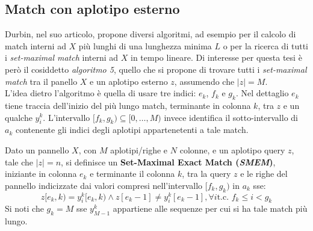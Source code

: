 \subsection{Match con aplotipo esterno}
Durbin, nel suo articolo, propone diversi algoritmi, ad esempio per il calcolo
di match interni ad $X$ più lunghi di una lunghezza minima $L$ o per la ricerca
di tutti i \textit{set-maximal match} interni ad $X$ in tempo lineare. Di
interesse per questa tesi è però il cosiddetto \textit{algoritmo 5}, quello che
si propone di trovare tutti i \textit{set-maximal match} tra il panello $X$ e un
aplotipo esterno $z$, assumendo che $|z|=M$.\\
L'idea dietro l'algoritmo è quella di usare tre indici: $e_k$, $f_k$ e
$g_k$. Nel dettaglio $e_k$ tiene traccia dell'inizio del più lungo match,
terminante in colonna $k$, tra $z$ e un qualche $y_i^k$. L'intervallo
$[f_k,g_k)\subseteq[0,\ldots,M)$ invece identifica il sotto-intervallo di
$a_k$ contenente gli indici degli aplotipi appartenetenti a tale match.
\begin{definizione}
  Dato un pannello $X$, con $M$ aplotipi/righe e $N$ colonne, e un aplotipo
  query $z$, tale che $|z|=n$, si definisce un \textbf{Set-Maximal Exact Match
    (\textit{SMEM})}, iniziante in colonna $e_k$ e terminante il colonna
  $k$, tra 
  la query $z$ e le righe del pannello indicizzate dai valori compresi
  nell'intervallo $[f_k,g_k)$ in $a_k$ sse:
  \[z[e_k,k)=y_i^k[e_k,k)\land z[e_k-1]\neq y_i^k[e_k-1], \forall i\mbox{
      t.c. }f_k\leq i < g_k\]
  Si noti che $g_k=M$ sse $y_{M-1}^k$ appartiene alle sequenze per cui si ha tale
  match più lungo.\\
\end{definizione}

